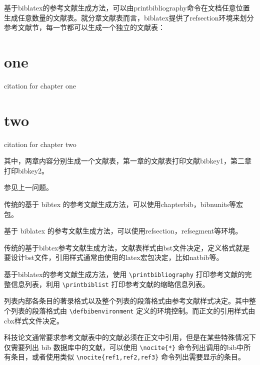 基于biblatex的参考文献生成方法，可以由printbibliography命令在文档任意位置生成任意数量的文献表。就分章文献表而言，biblatex提供了refsection环境来划分参考文献节，每一节都可以生成一个独立的文献表：

\begin{texlist}
\chapter{one}
\begin{refsection}
citation for chapter one\cite{bibkey1}
\printbibliography
\end{refsection}

\chapter{two}
\begin{refsection}
citation for chapter two\cite{bibkey2}
\printbibliography
\end{refsection}
\end{texlist}

其中，两章内容分别生成一个文献表，第一章的文献表打印文献bibkey1，第二章打印bibkey2。


参见上一问题。

传统的基于 bibtex 的参考文献生成方法，可以使用chapterbib，bibnunits等宏包。

基于 biblatex 的参考文献生成方法，可以使用refsection，refsegment等环境。




传统的基于bibtex参考文献生成方法，文献表样式由bst文件决定，定义格式就是要设计bst文件，引用样式通常由使用的latex宏包决定，比如natbib等。

基于biblatex的参考文献生成方法，使用 \verb|\printbibliography| 打印参考文献的完整信息列表，利用 \verb|\printbiblist| 打印参考文献的缩略信息列表。

列表内部各条目的著录格式以及整个列表的段落格式由参考文献样式决定。其中整个列表的段落格式由 \verb|\defbibenvironment| 定义的环境控制。而正文的引用样式由cbx样式文件决定。



科技论文通常要求参考文献表中的文献必须在正文中引用，但是在某些特殊情况下仅需要列出 bib 数据库中的文献，可以使用 \verb|\nocite{*}| 命令列出调用的bib中所有条目，或者使用类似 \verb|\nocite{ref1,ref2,ref3}| 命令列出需要显示的条目。

